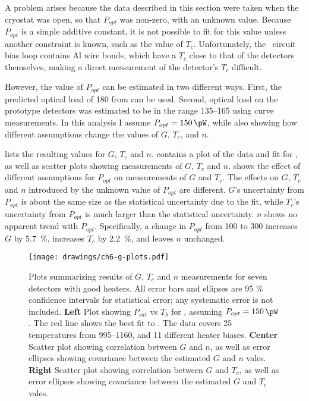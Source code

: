 A problem arises because the data described in this section were taken when the cryostat was open, so that $P_{opt}$ was non-zero, with an unknown value.
Because $P_{opt}$ is a simple additive constant, it is not possible to fit for this value unless another constraint is known, such as the value of $T_c$.
Unfortunately, the \TES\ circuit bias loop contains Al wire bonds, which have a $T_c$ close to that of the detectors themselves, making a direct measurement of the detector's $T_c$ difficult.

However, the value of $P_{opt}$ can be estimated in two different ways. 
First, the predicted optical load of \SI{180}{\pW} from  can be used.
Second, optical load on the prototype detectors was estimated to be in the range \SIrange{135}{165}{\pW} using \IV curve measurements.
In this analysis I assume $P_{opt} = \SI{150}{\pW}$, while also showing how different assumptions change the values of  $G$, $T_c$, and $n$.

 lists the resulting values for $G$, $T_c$ and $n$.
 contains a plot of the data and fit for , as well as scatter plots showing measurements of $G$, $T_c$ and $n$.
 shows the effect of different assumptions for $P_{opt}$ on measurements of $G$ and $T_c$.
The effects on $G$, $T_c$ and $n$ introduced by the unknown value of $P_{opt}$ are different.
$G$'s uncertainty from $P_{opt}$ is about the same size as the statistical uncertainty due to the fit, while $T_c$'s uncertainty from $P_{opt}$ is much larger than the statistical uncertainty.
$n$ shows no apparent trend with $P_{opt}$.
Specifically, a change in $P_{opt}$ from \SI{100}{\pW} to \SI{300}{\pW} increases $G$ by \SI{5.7}{\percent}, increases $T_c$ by \SI{2.2}{\percent}, and leaves $n$ unchanged.

\begin{figure*}
\texttt{[image: drawings/ch6-g-plots.pdf]}
\caption[$G$, $T_c$, and $n$ measurements]{
Plots summarizing results of $G$, $T_c$ and $n$ measurements for seven detectors with good heaters.
All error bars and ellipses are 95 \% confidence intervals for statistical error; any systematic error is not included.
\textbf{Left} Plot showing $P_{sat}$ vs $T_b$ for , assuming $P_{opt} = \SI{150}{\pW}$.
The red line shows the best fit to .
The data covers 25 temperatures from \SIrange{995}{1160}{\mK}, and 11 different heater biases.
\textbf{Center} Scatter plot showing correlation between $G$ and $n$, as well as error ellipses showing covariance between the estimated $G$ and $n$ vales.
\textbf{Right} Scatter plot showing correlation between $G$ and $T_c$, as well as error ellipses showing covariance between the estimated $G$ and $T_c$ vales.
} 
\label{fig:heater-g-plots}
\end{figure*}

